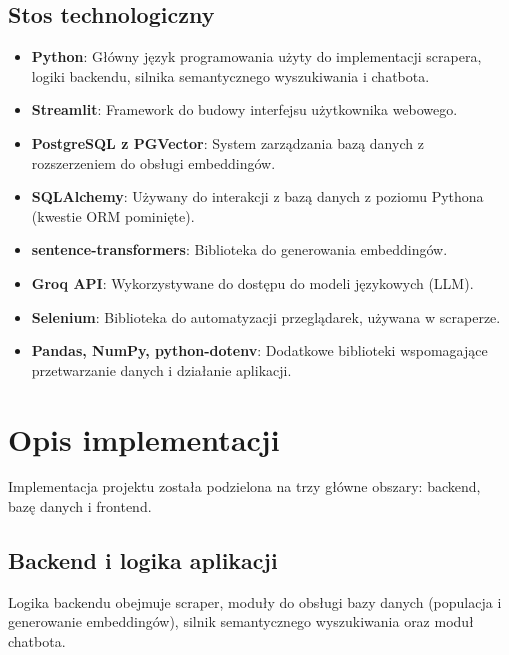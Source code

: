 \documentclass{article}
\begin{document}
\subsection{Stos technologiczny}
\begin{itemize}
    \item \textbf{Python}: Główny język programowania użyty do implementacji scrapera, logiki backendu, silnika semantycznego wyszukiwania i chatbota.
    \item \textbf{Streamlit}: Framework do budowy interfejsu użytkownika webowego.
    \item \textbf{PostgreSQL z PGVector}: System zarządzania bazą danych z rozszerzeniem do obsługi embeddingów.
    \item \textbf{SQLAlchemy}: Używany do interakcji z bazą danych z poziomu Pythona (kwestie ORM pominięte).
    \item \textbf{sentence-transformers}: Biblioteka do generowania embeddingów.
    \item \textbf{Groq API}: Wykorzystywane do dostępu do modeli językowych (LLM).
    \item \textbf{Selenium}: Biblioteka do automatyzacji przeglądarek, używana w scraperze.
    \item \textbf{Pandas, NumPy, python-dotenv}: Dodatkowe biblioteki wspomagające przetwarzanie danych i działanie aplikacji.
\end{itemize}

\section{Opis implementacji}
Implementacja projektu została podzielona na trzy główne obszary: backend, bazę danych i frontend.

\subsection{Backend i logika aplikacji}
Logika backendu obejmuje scraper, moduły do obsługi bazy danych (populacja i generowanie embeddingów), silnik semantycznego wyszukiwania oraz moduł chatbota.
\end{document}

